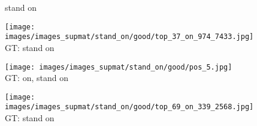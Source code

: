 \documentclass[10pt,twocolumn,letterpaper]{article}
\begin{document}
\begin{figure*}[t]
	\begin{minipage}[t]{0.005\textwidth}
    	\centering
    	\vspace{-9.5ex}
    	\begin{turn}{90}
    	stand on
    	\end{turn}
    	\vspace{5ex}
   	\end{minipage}
    \hspace{0.01\textwidth}
    \begin{minipage}[t]{0.18\textwidth}
    	\centering
       	\texttt{[image: images/images\_supmat/stand\_on/good/top\_37\_on\_974\_7433.jpg]}\\
       	\vspace{0.3ex}
       	GT: stand on
       	\vspace{0.2ex}
    \end{minipage}
    \hspace{0.005\textwidth}
    \begin{minipage}[t]{0.18\textwidth}
    	\centering
       	\texttt{[image: images/images\_supmat/stand\_on/good/pos\_5.jpg]}\\
       	\vspace{0.3ex}
       	GT: on, stand on
       	\vspace{0.2ex}
    \end{minipage} 
    \hspace{0.005\textwidth}
    \begin{minipage}[t]{0.18\textwidth}
    	\centering
       	\texttt{[image: images/images\_supmat/stand\_on/good/top\_69\_on\_339\_2568.jpg]}\\
       	\vspace{0.3ex}
       	GT: stand on
       	\vspace{0.2ex}
    \end{minipage}  
    \hspace{0.005\textwidth}
    \begin{minipage}[t]{0.18\textwidth}
       	\centering

\end{minipage}
\end{figure*}
\end{document}
